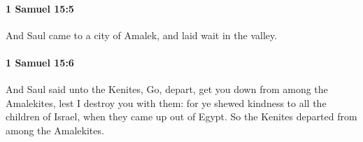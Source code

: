 		\paragraph{1 Samuel 15:5} %
			\label{1SAMUEL-15-5}

			And Saul came to a city of Amalek, and laid wait in the valley.


		\paragraph{1 Samuel 15:6} %
			\label{1SAMUEL-15-6}

			And Saul said unto the Kenites, Go, depart, get you down from among the Amalekites, lest I destroy you with them: for ye shewed kindness to all the children of Israel, when they came up out of Egypt. So the Kenites departed from among the Amalekites.


